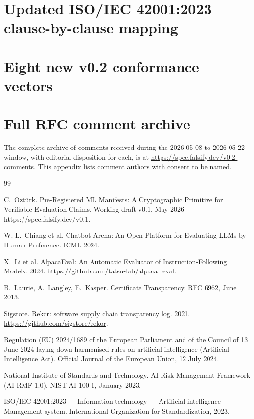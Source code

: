 \documentclass[11pt, a4paper]{article}
\begin{document}

\section{Updated ISO/IEC 42001:2023 clause-by-clause mapping}
\label{app:iso}


\section{Eight new v0.2 conformance vectors}
\label{app:vectors}


\section{Full RFC comment archive}
\label{app:rfc-archive}

The complete archive of comments received during the 2026-05-08 to 2026-05-22 window, with editorial disposition for each, is at \url{https://spec.falsify.dev/v0.2-comments}. This appendix lists comment authors with consent to be named.


\begin{thebibliography}{99}

C.~Öztürk. Pre-Registered ML Manifests: A Cryptographic Primitive for Verifiable Evaluation Claims. Working draft v0.1, May 2026. \url{https://spec.falsify.dev/v0.1}.

W.-L.~Chiang et al. Chatbot Arena: An Open Platform for Evaluating LLMs by Human Preference. ICML 2024.

X.~Li et al. AlpacaEval: An Automatic Evaluator of Instruction-Following Models. 2024. \url{https://github.com/tatsu-lab/alpaca_eval}.

B.~Laurie, A.~Langley, E.~Kasper. Certificate Transparency. RFC 6962, June 2013.

Sigstore. Rekor: software supply chain transparency log. 2021. \url{https://github.com/sigstore/rekor}.

Regulation (EU) 2024/1689 of the European Parliament and of the Council of 13 June 2024 laying down harmonised rules on artificial intelligence (Artificial Intelligence Act). Official Journal of the European Union, 12 July 2024.

National Institute of Standards and Technology. AI Risk Management Framework (AI RMF 1.0). NIST AI 100-1, January 2023.

ISO/IEC 42001:2023 — Information technology — Artificial intelligence — Management system. International Organization for Standardization, 2023.

\end{thebibliography}
\end{document}

